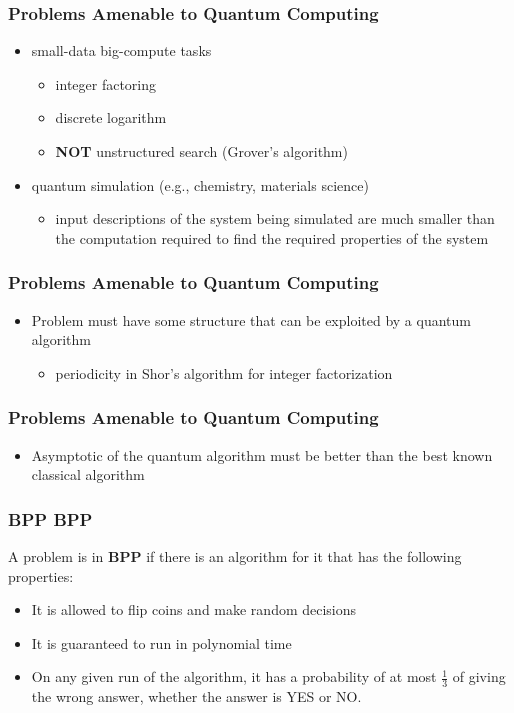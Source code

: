 \documentclass[12pt]{beamer}
\newcommand{\FrameTitle}[2]{\frametitle{#1 \hfill \small\textnormal{\textcolor{midgray}{#2}}}}
\begin{document}
\begin{frame}\FrameTitle{Problems Amenable to Quantum Computing}{}
    \begin{itemize}
        \item small-data big-compute tasks
        \begin{itemize}
            \item integer factoring
            \item discrete logarithm
            \item \textbf{NOT} unstructured search (Grover's algorithm)
        \end{itemize}
        \item quantum simulation (e.g., chemistry, materials science)
        \begin{itemize}
            \item input descriptions of the system being simulated are much
                smaller than the computation required to find the required properties
                of the system
        \end{itemize}
    \end{itemize}
\end{frame}


\begin{frame}\FrameTitle{Problems Amenable to Quantum Computing}{}
    \begin{itemize}
        \item Problem must have some structure that can be exploited by a quantum algorithm
        \begin{itemize}
            \item periodicity in Shor's algorithm for integer factorization
        \end{itemize}
    \end{itemize}
\end{frame}

\begin{frame}\FrameTitle{Problems Amenable to Quantum Computing}{}
    \begin{itemize}
        \item Asymptotic of the quantum algorithm must be better than the best known classical algorithm
    \end{itemize}
\end{frame}


\begin{frame}\FrameTitle{BPP}{BPP}
    A problem is in \textbf{BPP} if there is an algorithm for it that has the following properties:
    \begin{itemize}
        \item It is allowed to flip coins and make random decisions
        \item It is guaranteed to run in polynomial time
        \item On any given run of the algorithm, it has a probability of at most $\frac{1}{3}$ of
              giving the wrong answer, whether the answer is YES or NO.
    \end{itemize}
\end{frame}
\end{document}
